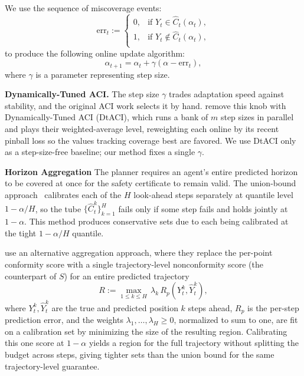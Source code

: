 \documentclass[letterpaper]{article} %
\begin{document}
We use the sequence of miscoverage events:
\[
\mathrm{err}_t := 
\begin{cases}
0, & \text{if } Y_t \in \hat{C}_t(\alpha_t),\\
1, & \text{if } Y_t \notin \hat{C}_t(\alpha_t),\\
\end{cases}
\]
to produce the following online update algorithm:
\[
\alpha_{t+1}= \alpha_t + \gamma (\alpha - \mathrm{err}_t),
\]
where \(\gamma\) is a parameter representing step size. 

\textbf{Dynamically-Tuned ACI.} The step size \(\gamma\) trades adaptation speed
against stability, and the original ACI work selects it by hand. \citet{gibbs2024conformal}
remove this knob with Dynamically-Tuned ACI (DtACI), which runs a bank of \(m\) step
sizes in parallel and plays their weighted-average level, reweighting each online by
its recent pinball loss so the values tracking coverage best are favored. We use DtACI
only as a step-size-free baseline; our method fixes a single \(\gamma\).

\textbf{Horizon Aggregation} The planner requires an agent's entire predicted horizon to be covered at once for the safety certificate to remain valid. The union-bound approach~\cite{lindemann_safe_2023} calibrates each of the \(H\) look-ahead steps separately at quantile level \(1-\alpha/H\), so the tube \(\{\hat{C}_t^k\}_{k=1}^{H}\) fails only if some step fails and holds jointly at \(1-\alpha\). This method produces conservative sets due to each being calibrated at the tight \(1-\alpha/H\) quantile.

\citeauthor{cleaveland_conformal_2024} use an alternative aggregation approach, where they replace the per-point conformity score with a single trajectory-level nonconformity score (the counterpart of \(S\)) for an entire predicted trajectory
\[
R := \max_{1 \le k \le H} \, \lambda_k\, R_p\!\left(Y_t^k, \hat{Y}_t^k\right),
\]
where \(Y_t^k, \hat{Y}_t^k\) are the true and predicted position \(k\) steps ahead, \(R_p\) is the per-step prediction error, and the weights
\(\lambda_1,\dots,\lambda_H \ge 0\), normalized to sum to one, are fit on a calibration set by minimizing the size of the resulting region. Calibrating this one score at \(1-\alpha\) yields a region for the full trajectory without splitting the budget across steps, giving tighter sets than the union bound for the same trajectory-level guarantee.


\end{document}
